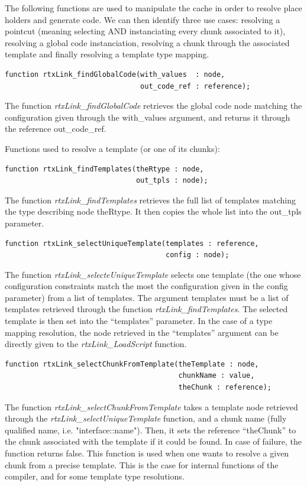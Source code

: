 \documentclass[american]{rtxreport}
\begin{document}
\vspace{20pt}

The following functions are used to manipulate the cache in order to resolve
place holders and generate code. We can then identify three use cases:
resolving a pointcut (meaning selecting AND instanciating every chunk
associated to it), resolving a global code instanciation, resolving a chunk
through the associated template and finally resolving a template type mapping.

\begin{lstlisting}
function rtxLink_findGlobalCode(with_values  : node,
                                out_code_ref : reference);
\end{lstlisting}
The function \emph{rtxLink\_findGlobalCode} retrieves the global code node
matching the configuration given through the with\_values argument, and returns
it through the reference out\_code\_ref.

\vspace{20pt}

Functions used to resolve a template (or one of its chunks):
\begin{lstlisting}
function rtxLink_findTemplates(theRtype : node,
                               out_tpls : node);
\end{lstlisting}
The function \emph{rtxLink\_findTemplates} retrieves the full list of templates
matching the type describing node theRtype. It then copies the whole list into
the out\_tpls parameter.

\begin{lstlisting}
function rtxLink_selectUniqueTemplate(templates : reference,
                                      config : node);
\end{lstlisting}
The function \emph{rtxLink\_selecteUniqueTemplate} selects one template (the
one whose configuration constraints match the most the configuration given in
the config parameter) from a list of templates. The argument templates must be
a list of templates retrieved through the function
\emph{rtxLink\_findTemplates}. The selected template is then set into the
``templates'' parameter. In the case of a type mapping resolution, the node
retrieved in the ``templates'' argument can be directly given to the
\emph{rtxLink\_LoadScript} function.

\begin{lstlisting}
function rtxLink_selectChunkFromTemplate(theTemplate : node,
                                         chunkName : value,
                                         theChunk : reference);
\end{lstlisting}
The function \emph{rtxLink\_selectChunkFromTemplate} takes a template node
retrieved through the \emph{rtxLink\_selectUniqueTemplate} function, and a
chunk name (fully qualified name, i.e. "interface::name"). Then, it sets the
reference ``theChunk'' to the chunk associated with the template if it could be
found. In case of failure, the function returns false. This function is used
when one wants to resolve a given chunk from a precise template. This is the
case for internal functions of the compiler, and for some template type
resolutions.
\end{document}
